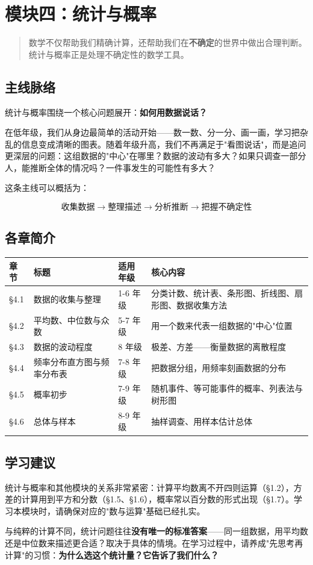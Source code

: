\chapter*{模块四：统计与概率}


\begin{quote}
数学不仅帮助我们精确计算，还帮助我们在\textbf{不确定}的世界中做出合理判断。统计与概率正是处理不确定性的数学工具。
\end{quote}


\section*{主线脉络}


统计与概率围绕一个核心问题展开：\textbf{如何用数据说话？}

在低年级，我们从身边最简单的活动开始——数一数、分一分、画一画，学习把杂乱的信息变成清晰的图表。随着年级升高，我们不再满足于"看图说话"，而是追问更深层的问题：这组数据的"中心"在哪里？数据的波动有多大？如果只调查一部分人，能推断全体的情况吗？一件事发生的可能性有多大？

这条主线可以概括为：

\[
\text{收集数据} \longrightarrow \text{整理描述} \longrightarrow \text{分析推断} \longrightarrow \text{把握不确定性}
\]


\section*{各章简介}


\begin{center}
\begin{tabular}{llll}
\toprule
章节 & 标题 & 适用年级 & 核心内容 \\
\midrule
§4.1 & 数据的收集与整理 & 1-6 年级 & 分类计数、统计表、条形图、折线图、扇形图、数据收集方法 \\
§4.2 & 平均数、中位数与众数 & 5-7 年级 & 用一个数来代表一组数据的"中心"位置 \\
§4.3 & 数据的波动程度 & 8 年级 & 极差、方差——衡量数据的离散程度 \\
§4.4 & 频率分布直方图与频率分布表 & 7-8 年级 & 把数据分组，用频率刻画数据的分布 \\
§4.5 & 概率初步 & 7-9 年级 & 随机事件、等可能事件的概率、列表法与树形图 \\
§4.6 & 总体与样本 & 8-9 年级 & 抽样调查、用样本估计总体 \\
\bottomrule
\end{tabular}
\end{center}


\section*{学习建议}


统计与概率和其他模块的关系非常紧密：计算平均数离不开四则运算（§1.2），方差的计算用到平方和分数（§1.5、§1.6），概率常以百分数的形式出现（§1.7）。学习本模块时，请确保对应的"数与运算"基础已经扎实。

与纯粹的计算不同，统计问题往往\textbf{没有唯一的标准答案}——同一组数据，用平均数还是中位数来描述更合适？取决于具体的情境。在学习过程中，请养成"先思考再计算"的习惯：\textbf{为什么选这个统计量？它告诉了我们什么？}
